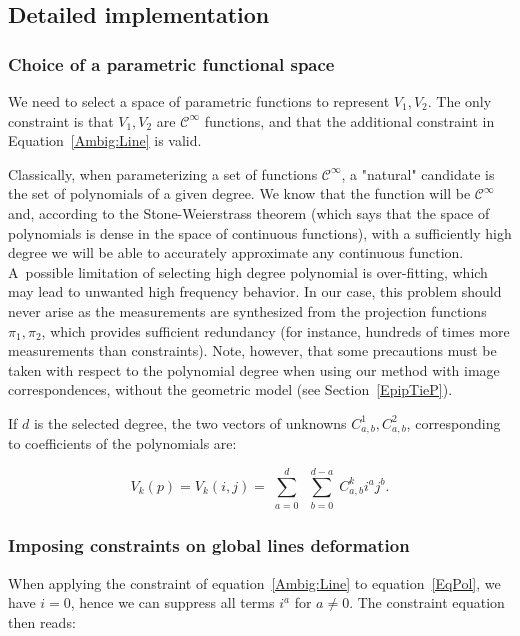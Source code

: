 \documentclass{ipol}
\begin{document}
\subsection{Detailed implementation}


\subsubsection{Choice of a parametric functional space}
\label{ChoicePolyn}

We need to select a space of parametric functions to represent $V_1,V_2$. The only constraint
is that $V_1,V_2$ are $\mathcal{C}^{\infty}$ functions, and that the additional constraint in 
Equation~\eqref{Ambig:Line} is valid. 

Classically, when parameterizing a set of functions  $\mathcal{C}^{\infty}$,
a "natural" candidate is the set of polynomials of a given degree. We know that the function will be
$\mathcal{C}^{\infty}$ and, according to the Stone-Weierstrass theorem \cite{Weierstrass1885,Stone1937} (which says that the space of polynomials is dense in the space of continuous functions),  with a sufficiently high
degree we will be able to accurately approximate any continuous function. A~possible
limitation of selecting high degree polynomial is over-fitting, which may lead to
unwanted high frequency behavior. In our case, this problem should never arise as the measurements  are synthesized from the projection functions $\pi_1,\pi_2$, which provides sufficient redundancy (for instance,
 hundreds of times more measurements than constraints). {Note, however, that some precautions must be taken with respect to the polynomial degree when using our method with image correspondences, without the geometric model (see Section~\ref{EpipTieP})}.

If $d$ is the selected degree, the two vectors of unknowns $C^1_{a,b},C^2_{a,b}$, 
corresponding to coefficients of the polynomials are:


\begin{equation}
   V_k(p) = V_k(i,j) =  \sum\limits_{\substack{a=0}}^d  \sum\limits_{\substack{b=0}}^{d-a}  C^k_{a,b}  i^a j^b. \label{EqPol}
\end{equation}
   
\subsubsection{Imposing constraints on global lines deformation}

{When applying the constraint of equation~\eqref{Ambig:Line} to equation~\eqref{EqPol}, 
we have $i=0$, hence we can suppress all terms  $i^a$ for $a\neq 0$}. The constraint equation then reads:
\end{document}
